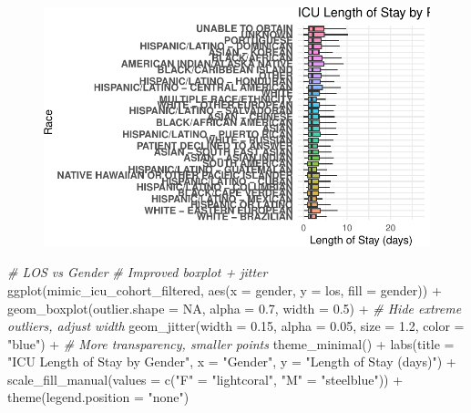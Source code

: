 \documentclass[
]{article}
\newenvironment{Shaded}{\begin{snugshade}}{\end{snugshade}}
\newcommand{\AttributeTok}[1]{\textcolor[rgb]{0.77,0.63,0.00}{#1}}
\newcommand{\CommentTok}[1]{\textcolor[rgb]{0.56,0.35,0.01}{\textit{#1}}}
\newcommand{\ConstantTok}[1]{\textcolor[rgb]{0.00,0.00,0.00}{#1}}
\newcommand{\FloatTok}[1]{\textcolor[rgb]{0.00,0.00,0.81}{#1}}
\newcommand{\FunctionTok}[1]{\textcolor[rgb]{0.00,0.00,0.00}{#1}}
\newcommand{\NormalTok}[1]{\textcolor[rgb]{0.00,0.00,0.00}{#1}}
\newcommand{\OtherTok}[1]{\textcolor[rgb]{0.56,0.35,0.01}{#1}}
\newcommand{\SpecialCharTok}[1]{\textcolor[rgb]{0.00,0.00,0.00}{#1}}
\newcommand{\StringTok}[1]{\textcolor[rgb]{0.31,0.60,0.02}{#1}}
\begin{document}
\begin{figure}[H]

{\centering \includegraphics{hw3_files/figure-pdf/8.1-1.pdf}

}

\end{figure}

\begin{Shaded}
\begin{Highlighting}[]
\CommentTok{\# LOS vs Gender}
\CommentTok{\# Improved boxplot + jitter}
\FunctionTok{ggplot}\NormalTok{(mimic\_icu\_cohort\_filtered, }\FunctionTok{aes}\NormalTok{(}\AttributeTok{x =}\NormalTok{ gender, }\AttributeTok{y =}\NormalTok{ los, }
                                      \AttributeTok{fill =}\NormalTok{ gender)) }\SpecialCharTok{+}
  \FunctionTok{geom\_boxplot}\NormalTok{(}\AttributeTok{outlier.shape =} \ConstantTok{NA}\NormalTok{, }\AttributeTok{alpha =} \FloatTok{0.7}\NormalTok{, }\AttributeTok{width =} \FloatTok{0.5}\NormalTok{) }\SpecialCharTok{+}  
  \CommentTok{\# Hide extreme outliers, adjust width}
  \FunctionTok{geom\_jitter}\NormalTok{(}\AttributeTok{width =} \FloatTok{0.15}\NormalTok{, }\AttributeTok{alpha =} \FloatTok{0.05}\NormalTok{, }\AttributeTok{size =} \FloatTok{1.2}\NormalTok{, }
              \AttributeTok{color =} \StringTok{"blue"}\NormalTok{) }\SpecialCharTok{+}  \CommentTok{\# More transparency, smaller points}
  \FunctionTok{theme\_minimal}\NormalTok{() }\SpecialCharTok{+}
  \FunctionTok{labs}\NormalTok{(}\AttributeTok{title =} \StringTok{"ICU Length of Stay by Gender"}\NormalTok{, }\AttributeTok{x =} \StringTok{"Gender"}\NormalTok{, }
       \AttributeTok{y =} \StringTok{"Length of Stay (days)"}\NormalTok{) }\SpecialCharTok{+}
  \FunctionTok{scale\_fill\_manual}\NormalTok{(}\AttributeTok{values =} \FunctionTok{c}\NormalTok{(}\StringTok{"F"} \OtherTok{=} \StringTok{"lightcoral"}\NormalTok{, }\StringTok{"M"} \OtherTok{=} \StringTok{"steelblue"}\NormalTok{)) }\SpecialCharTok{+}  
  \FunctionTok{theme}\NormalTok{(}\AttributeTok{legend.position =} \StringTok{"none"}\NormalTok{)}
\end{Highlighting}
\end{Shaded}
\end{document}
